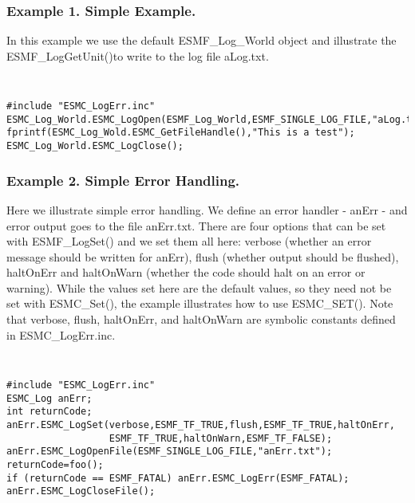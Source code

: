 %


\subsubsection{Example 1. Simple Example.}

In this example we use the default ESMF\_Log\_World object and illustrate
the ESMF\_LogGetUnit()to write to the log file aLog.txt.

{\tt
\begin{verbatim}
#include "ESMC_LogErr.inc"
ESMC_Log_World.ESMC_LogOpen(ESMF_Log_World,ESMF_SINGLE_LOG_FILE,"aLog.txt")
fprintf(ESMC_Log_Wold.ESMC_GetFileHandle(),"This is a test");
ESMC_Log_World.ESMC_LogClose();
\end{verbatim}
\tt}

\subsubsection{Example 2. Simple Error Handling.}

Here we illustrate simple error handling.  We define an error handler - anErr -
and error output goes to the
file anErr.txt.  There are four options that can be set with ESMF\_LogSet()
and we set them all here: verbose (whether an
error message should be written for anErr), flush (whether output should be
flushed), haltOnErr and haltOnWarn (whether the code should halt on
an error or warning).  While the values set here are the default
values, so they need not be set with ESMC\_Set(), the example illustrates how
to use ESMC\_SET().  Note that verbose, flush, haltOnErr, and haltOnWarn are symbolic
constants defined in ESMC\_LogErr.inc.
{\tt
\begin{verbatim}
#include "ESMC_LogErr.inc"
ESMC_Log anErr;
int returnCode;
anErr.ESMC_LogSet(verbose,ESMF_TF_TRUE,flush,ESMF_TF_TRUE,haltOnErr,
                  ESMF_TF_TRUE,haltOnWarn,ESMF_TF_FALSE);
anErr.ESMC_LogOpenFile(ESMF_SINGLE_LOG_FILE,"anErr.txt");
returnCode=foo();
if (returnCode == ESMF_FATAL) anErr.ESMC_LogErr(ESMF_FATAL); 
anErr.ESMC_LogCloseFile();
\end{verbatim}
\tt}

